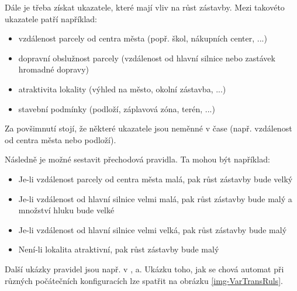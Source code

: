 \documentclass[a4paper,10pt]{article}
\begin{document}
Dále je třeba získat ukazatele, které mají vliv na růst zástavby. Mezi takovéto ukazatele patří například:
\begin{itemize}
 \item vzdálenost parcely od centra města (popř. škol, nákupních center, ...)
 \item dopravní obslužnost parcely (vzdálenost od hlavní silnice nebo zastávek hromadné dopravy)
 \item atraktivita lokality (výhled na město, okolní zástavba, ...)
 \item stavební podmínky (podloží, záplavová zóna, terén, ...)
\end{itemize}
Za povšimnutí stojí, že některé ukazatele jsou neměnné v čase (např. vzdálenost od centra města nebo podloží).

Následně je možné sestavit přechodová pravidla. Ta mohou být například:
\begin{itemize}
 \item Je-li vzdálenost parcely od centra města malá, pak růst zástavby bude velký
 \item Je-li vzdálenost od hlavní silnice velmi malá, pak růst zástavby bude malý a množství hluku bude velké
 \item Je-li vzdálenost od hlavní silnice velmi velká, pak růst zástavby bude malý
 \item Není-li lokalita atraktivní, pak růst zástavby bude malý
\end{itemize}

Další ukázky pravidel jsou např. v \cite{Ahm+-CalFuzCelAutModUrbDynSauAr}, \cite{ManHatPra-FuzzCellAutModAppAccUrbGroDynLingTerm} a\cite{LiuPhi-DevCelAutModUrbGroIncFuzSetApp}. Ukázku toho, jak se chová automat při různých počátečních konfiguracích lze spatřit na obrázku \ref{img-VarTransRuls}. 
\end{document}
